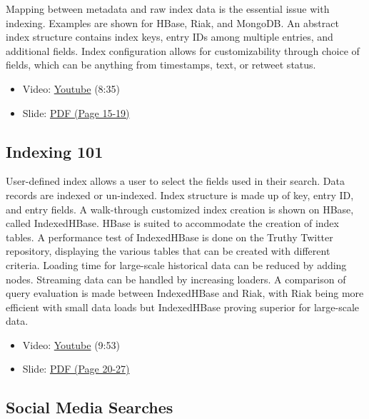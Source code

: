 Mapping between metadata and raw index data is the essential issue with
indexing. Examples are shown for HBase, Riak, and MongoDB. An abstract
index structure contains index keys, entry IDs among multiple entries,
and additional fields. Index configuration allows for customizability
through choice of fields, which can be anything from timestamps, text,
or retweet status.

\begin{itemize}
\tightlist
\item
  Video: \href{https://www.youtube.com/watch?v=Ec3VFeTGuo8}{Youtube}
  (8:35)
\item
  Slide:
  \href{https://drive.google.com/open?id=0B88HKpainTSfWUh6dVNHcXloSnc}{PDF
  (Page 15-19)}
\end{itemize}

\subsection{Indexing 101}\label{indexing-101}

User-defined index allows a user to select the fields used in their
search. Data records are indexed or un-indexed. Index structure is made
up of key, entry ID, and entry fields. A walk-through customized index
creation is shown on HBase, called IndexedHBase. HBase is suited to
accommodate the creation of index tables. A performance test of
IndexedHBase is done on the Truthy Twitter repository, displaying the
various tables that can be created with different criteria. Loading time
for large-scale historical data can be reduced by adding nodes.
Streaming data can be handled by increasing loaders. A comparison of
query evaluation is made between IndexedHBase and Riak, with Riak being
more efficient with small data loads but IndexedHBase proving superior
for large-scale data.

\begin{itemize}
\tightlist
\item
  Video: \href{https://www.youtube.com/watch?v=eKQaLkw-HBU}{Youtube}
  (9:53)
\item
  Slide:
  \href{https://drive.google.com/open?id=0B88HKpainTSfWUh6dVNHcXloSnc}{PDF
  (Page 20-27)}
\end{itemize}

\subsection{Social Media Searches}\label{social-media-searches}


